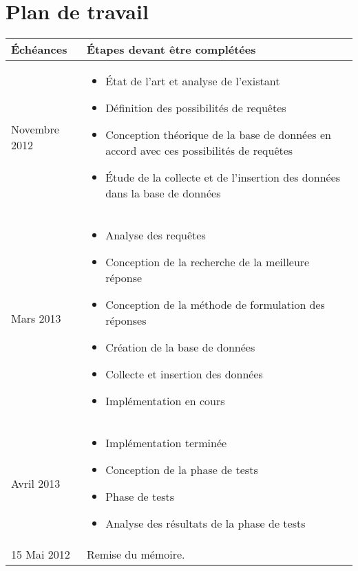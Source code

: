 \documentclass[a4paper,12pt]{article}
\begin{document}
\section{Plan de travail}
\begin{tabular}{p{4cm} p{9cm}}
  \toprule
  \large{Échéances} & \large{Étapes devant être complétées} \\
  \midrule
  \large{Novembre 2012} & \begin{itemize}
    \item État de l'art et analyse de l'existant
    \item Définition des possibilités de requêtes
    \item Conception théorique de la base de données en accord avec ces possibilités de requêtes
    \item Étude de la collecte et de l'insertion des données dans la base de données
  \end{itemize}
  \\
  \large{Mars 2013} & \begin{itemize}
    \item Analyse des requêtes
    \item Conception de la recherche de la meilleure réponse
    \item Conception de la méthode de formulation des réponses
    \item Création de la base de données
    \item Collecte et insertion des données
    \item Implémentation en cours
  \end{itemize}
  \\
  \large{Avril 2013} & \begin{itemize}
    \item Implémentation terminée
    \item Conception de la phase de tests
    \item Phase de tests
    \item Analyse des résultats de la phase de tests
  \end{itemize}
  \\
  \large{15 Mai 2012} & Remise du mémoire. \\
  \bottomrule
\end{tabular}
\end{document}
